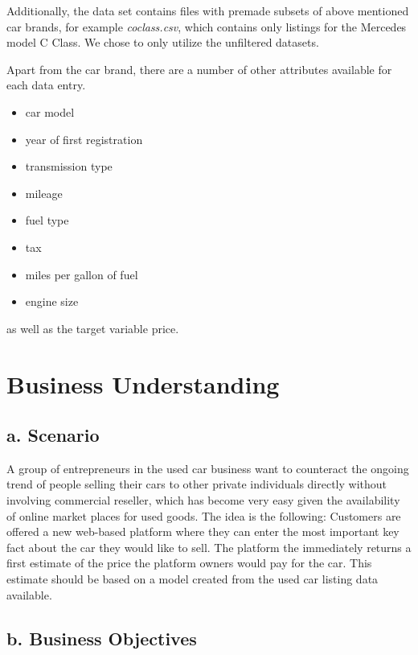 \documentclass[sigchi]{acmart}
\def\tightlist{}
\begin{document}
Additionally, the data set contains files with premade subsets of above mentioned car brands, for example \emph{coclass.csv}, which contains only listings for the Mercedes model C Class. We chose to only utilize the unfiltered datasets.

Apart from the car brand, there are a number of other attributes available for each data entry.

\begin{itemize}
\tightlist
\item
  car model
\item
  year of first registration
\item
  transmission type
\item
  mileage
\item
  fuel type
\item
  tax
\item
  miles per gallon of fuel
\item
  engine size
\end{itemize}

as well as the target variable price.

\hypertarget{business-understanding}{%
\section{Business Understanding}\label{business-understanding}}

\hypertarget{a.-scenario}{%
\subsection{a. Scenario}\label{a.-scenario}}

A group of entrepreneurs in the used car business want to counteract the ongoing trend of people selling their cars to other private individuals directly without involving commercial reseller, which has become very easy given the availability of online market places for used goods. The idea is the following: Customers are offered a new web-based platform where they can enter the most important key fact about the car they would like to sell. The platform the immediately returns a first estimate of the price the platform owners would pay for the car. This estimate should be based on a model created from the used car listing data available.

\hypertarget{b.-business-objectives}{%
\subsection{b. Business Objectives}\label{b.-business-objectives}}
\end{document}
